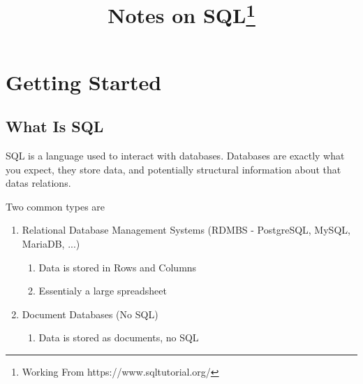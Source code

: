 \documentclass[10pt, english]{article}
\title{Notes on SQL\footnote{Working From https://www.sqltutorial.org/}}
\author{}
\begin{document}
\maketitle

\newpage
\section{Getting Started}
\subsection{What Is SQL}
SQL is a language used to interact with databases. Databases are exactly what you expect, they store data, 
and potentially structural information about that datas relations. 

Two common types are
\begin{enumerate}
    \item Relational Database Management Systems (RDMBS - PostgreSQL, MySQL, MariaDB, ...)
        \begin{enumerate}
            \item Data is stored in Rows and Columns
            \item Essentialy a large spreadsheet
        \end{enumerate}
    \item Document Databases (No SQL)
        \begin{enumerate}
            \item Data is stored as documents, no SQL
        \end{enumerate}
\end{enumerate}
\end{document}
